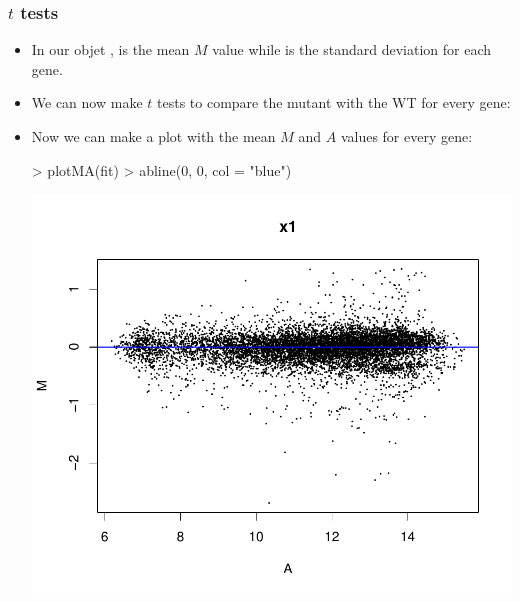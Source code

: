 \begin{frame}
  \frametitle{$t$ tests}
  \begin{itemize}
  \item In our objet ,  is the mean $M$ value while  is the standard deviation for each gene.
  \item We can now make $t$ tests to compare the mutant with the WT for every gene:
\begin{Schunk}
\end{Schunk}
  \item Now we can make a plot with the mean $M$ and $A$ values for every gene:
\begin{Schunk}
\begin{Sinput}
> plotMA(fit)
> abline(0, 0, col = "blue")
\end{Sinput}
\end{Schunk}
\includegraphics{plots/fig-032}
  \end{itemize}
\end{frame}

